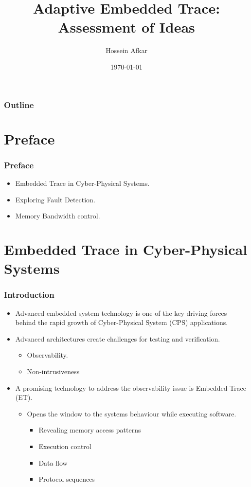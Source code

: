 \documentclass{beamer}
\title[Adaptive Embedded Trace]
{Adaptive Embedded Trace: Assessment of Ideas}
\author[]{Hossein Afkar}
\institute{DRTS Lab}
\date{\today}
\begin{document}
\frame{\titlepage}

\begin{frame}
    \frametitle{Outline}
    \tableofcontents[hideallsubsections]
\end{frame}


\section{Preface}
\begin{frame}
    \frametitle{Preface}
    \begin{itemize}
        \item Embedded Trace in Cyber-Physical Systems.
        \item Exploring Fault Detection.
        \item Memory Bandwidth control.
    \end{itemize}
\end{frame}

\section{Embedded Trace in Cyber-Physical Systems}
\begin{frame}
    \frametitle{Introduction}
    \begin{itemize}
        \item Advanced embedded system technology is one of the key
            driving forces behind the rapid growth
            of Cyber-Physical System (CPS) applications.
        \item Advanced architectures create challenges for testing and
            verification.
            \begin{itemize}
                \item Observability.
                \item Non-intrusiveness
            \end{itemize}
        \item A promising technology to address the observability issue is
            Embedded Trace (ET).
            \begin{itemize}
                \item Opens the window to the systems behaviour while
                    executing software.
                    \begin{itemize}
                        \item Revealing memory access patterns
                        \item Execution control
                        \item Data flow
                        \item Protocol sequences
                    \end{itemize}
            \end{itemize}
    \end{itemize}
\end{frame}
\end{document}
